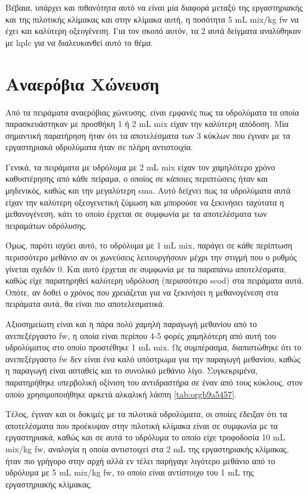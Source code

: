 \documentclass[11pt]{report}
\begin{document}
Βέβαια, υπάρχει και πιθανότητα αυτό να είναι μία διαφορά μεταξύ της εργαστηριακής και της πιλοτικής κλίμακας και στην κλίμακα αυτή, η ποσότητα 5 mL \acrshort{mix}/kg \acrshort{fw} να έχει και καλύτερη οξεογένεση. Για τον σκοπό αυτόν, τα 2 αυτά δείγματα αναλύθηκαν με \acrshort{hplc} για να διαλευκανθεί αυτό το θέμα.

\section{Αναερόβια Χώνευση}
\label{sec:orgc7f15c9}
Από τα πειράματα αναερόβιας χώνευσης, είναι εμφανές πως τα υδρολύματα τα οποία παρασκευάστηκαν με προσθήκη 1 ή 2 mL \acrshort{mix} είχαν την καλύτερη απόδοση. Μία σημαντική παρατήρηση ήταν ότι τα αποτελέσματα των 3 κύκλων που έγιναν με τα εργαστηριακά υδρολύματα ήταν σε πλήρη αντιστοιχία.

Γενικά, τα πειράματα με υδρόλυμα με 2 mL \acrshort{mix} είχαν τον χαμηλότερο χρόνο καθυστέρησης από κάθε πείραμα, ο οποίος σε κάποιες περιπτώσεις ήταν και μηδενικός, καθώς και την μεγαλύτερη \acrshort{sma}. Αυτό δείχνει πως τα υδρολύματα αυτά είχαν την καλύτερη οξεογενετική ζύμωση και μπορούσε να ξεκινήσει ταχύτατα η μεθανογένεση, κάτι το οποίο έρχεται σε συμφωνία με τα αποτελέσματα των πειραμάτων υδρόλυσης.

Όμως, παρότι ισχύει αυτό, το υδρόλυμα με 1 mL \acrshort{mix}, παράγει σε κάθε περίπτωση περισσότερο μεθάνιο αν οι χωνεύσεις λειτουργήσουν μέχρι την στιγμή που ο ρυθμός γίνεται σχεδόν 0. Και αυτό έρχεται σε συμφωνία με τα παραπάνω αποτελέσματα, καθώς είχε παρατηρηθεί καλύτερη υδρόλυση (περισσότερο \acrshort{scod}) στα πειράματα αυτά. Οπότε, αν δοθεί ο χρόνος που χρειάζεται για να ξεκινήσει η μεθανογένεση στα πειράματα αυτά, θα είναι πιο αποτελεσματικά.

Αξιοσημείωτη είναι και η πάρα πολύ χαμηλή παραγωγή μεθανίου από το ανεπεξέργαστο \acrshort{fw}, η οποία είναι περίπου 4-5 φορές χαμηλότερη από αυτή του υδρολύματος στο οποίο προστέθηκε 1 mL \acrshort{mix}. Ως συμπέρασμα, διαπιστώθηκε ότι το ανεπεξέργαστο \acrshort{fw} δεν είναι ένα καλό υπόστρωμα για την παραγωγή μεθανίου, καθώς η παραγωγή είναι ασταθείς και το συνολικό μεθάνιο λίγο. Συγκεκριμένα, παρατηρήθηκε υπερβολική οξίνιση του αντιδραστήρα σε έναν από τους κύκλους, στον οποίο χρησιμοποιήθηκε αρκετά αλκαλική λάσπη \ref{tab:orgb9a5457}.

Τέλος, έγιναν και οι δοκιμές με τα πιλοτικά υδρολύματα, οι οποίες έδειξαν ότι τα αποτελέσματα που προέκυψαν στην πιλοτική κλίμακα είναι σε συμφωνία με τα εργαστηριακά, καθώς και σε αυτά το υδρόλυμα το οποίο είχε τροφοδοσία 10 mL \acrshort{mix}/kg \acrshort{fw}, αναλογία η οποία αντιστοιχεί στα 2 mL της εργαστηριακής κλίμακας, ήταν πιο γρήγορο στην αρχή αλλά εν τέλει παρήγαγε λιγότερο μεθάνιο από το υδρόλυμα με 5 mL \acrshort{mix}/kg \acrshort{fw}, το οποίο είναι αντίστοιχο του 1 mL της εργαστηριακής κλίμακας.
\end{document}
